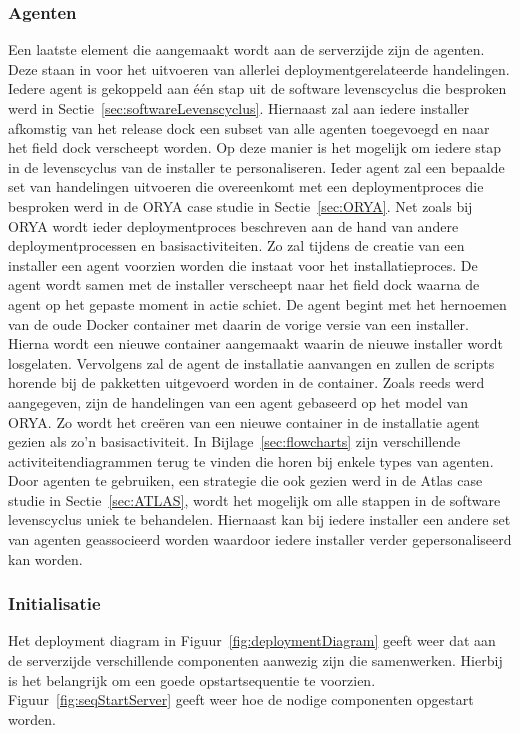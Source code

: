 \subsubsection{Agenten}
Een laatste element die aangemaakt wordt aan de serverzijde zijn de agenten.
Deze staan in voor het uitvoeren van allerlei deploymentgerelateerde handelingen.
Iedere agent is gekoppeld aan één stap uit de software levenscyclus die besproken werd in Sectie~\ref{sec:softwareLevenscyclus}.
Hiernaast zal aan iedere installer afkomstig van het release dock een subset van alle agenten toegevoegd en  naar het field dock verscheept worden.
Op deze manier is het mogelijk om iedere stap in de levenscyclus van de installer te personaliseren.
Ieder agent zal een bepaalde set van handelingen uitvoeren die overeenkomt met een deploymentproces die besproken werd in de ORYA case studie in Sectie~\ref{sec:ORYA}.
Net zoals bij ORYA wordt ieder deploymentproces beschreven aan de hand van andere deploymentprocessen en basisactiviteiten.
Zo zal tijdens de creatie van een installer een agent voorzien worden die instaat voor het installatieproces.
De agent wordt samen met de installer verscheept naar het field dock waarna de agent op het gepaste moment in actie schiet.
De agent begint met het hernoemen van de oude Docker container met daarin de vorige versie van een installer.
Hierna wordt een nieuwe container aangemaakt waarin de nieuwe installer wordt losgelaten.
Vervolgens zal de agent de installatie aanvangen en zullen de scripts horende bij de pakketten uitgevoerd worden in de container.
Zoals reeds werd aangegeven, zijn de handelingen van een agent gebaseerd op het model van ORYA.
Zo wordt het creëren van een nieuwe container in de installatie agent gezien als zo'n basisactiviteit.
In Bijlage~\ref{sec:flowcharts} zijn verschillende activiteitendiagrammen terug te vinden die horen bij enkele types van agenten.
Door agenten te gebruiken, een strategie die ook gezien werd in de Atlas case studie in Sectie~\ref{sec:ATLAS}, wordt het mogelijk om alle stappen in de software levenscyclus uniek te behandelen.
Hiernaast kan bij iedere installer een andere set van agenten geassocieerd worden waardoor iedere installer verder gepersonaliseerd kan worden.

\subsubsection{Initialisatie}\label{sec:initServer}
Het deployment diagram in Figuur~\ref{fig:deploymentDiagram} geeft weer dat aan de serverzijde verschillende componenten aanwezig zijn die samenwerken.
Hierbij is het belangrijk om een goede opstartsequentie te voorzien.
Figuur~\ref{fig:seqStartServer} geeft weer hoe de nodige componenten opgestart worden.

